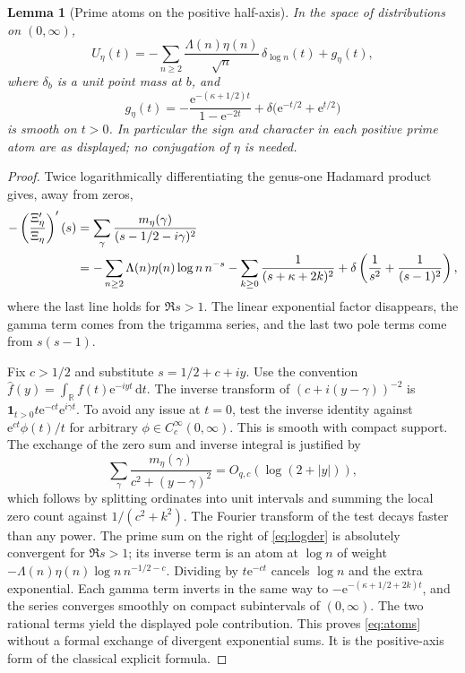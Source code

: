 \documentclass[11pt]{article}
\newtheorem{lemma}[theorem]{Lemma}
\theoremstyle{remark}\newtheorem{remark}[theorem]{Remark}
\newcommand{\R}{\mathbb R}
\newcommand{\dd}{\,\mathrm d}
\newcommand{\e}{\mathrm e}
\newcommand{\ind}{\mathbf 1}
\begin{document}
\begin{lemma}[Prime atoms on the positive half-axis]\label{lem:atoms}
In the space of distributions on $(0,\infty)$,
\begin{equation}\label{eq:atoms}
 U_\eta(t)=-\sum_{n\ge2}\frac{\Lambda(n)\eta(n)}{\sqrt n}\,\delta_{\log n}(t)+g_\eta(t),
\end{equation}
where $\delta_b$ is a unit point mass at $b$, and
\[
 g_\eta(t)=-\frac{\e^{-(\kappa+1/2)t}}{1-\e^{-2t}}
 +\delta\bigl(\e^{-t/2}+\e^{t/2}\bigr)
\]
is smooth on $t>0$. In particular the sign and character in each positive prime atom are as displayed; no conjugation of $\eta$ is needed.
\end{lemma}
\begin{proof}
Twice logarithmically differentiating the genus-one Hadamard product gives, away from zeros,
\begin{align}
 -\left(\frac{\Xi_\eta'}{\Xi_\eta}\right)'(s)
 &=\sum_{\gamma}\frac{m_\eta(\gamma)}{(s-1/2-i\gamma)^2}\notag\\
 &=-\sum_{n\ge2}\Lambda(n)\eta(n)\log n\, n^{-s}
 -\sum_{k\ge0}\frac1{(s+\kappa+2k)^2}
 +\delta\left(\frac1{s^2}+\frac1{(s-1)^2}\right),\label{eq:logder}
\end{align}
where the last line holds for $\Re s>1$. The linear exponential factor disappears, the gamma term comes from the trigamma series, and the last two pole terms come from $s(s-1)$.

Fix $c>1/2$ and substitute $s=1/2+c+iy$. Use the convention $\widehat f(y)=\int_\R f(t)\e^{-iyt}\dd t$. The inverse transform of $(c+i(y-\gamma))^{-2}$ is $\ind_{t>0}t\e^{-ct}\e^{i\gamma t}$. To avoid any issue at $t=0$, test the inverse identity against $\e^{ct}\phi(t)/t$ for arbitrary $\phi\in C_c^\infty(0,\infty)$. This is smooth with compact support. The exchange of the zero sum and inverse integral is justified by
\[
 \sum_\gamma\frac{m_\eta(\gamma)}{c^2+(y-\gamma)^2}=O_{q,c}(\log(2+|y|)),
\]
which follows by splitting ordinates into unit intervals and summing the local zero count against $1/(c^2+k^2)$. The Fourier transform of the test decays faster than any power. The prime sum on the right of \eqref{eq:logder} is absolutely convergent for $\Re s>1$; its inverse term is an atom at $\log n$ of weight $-\Lambda(n)\eta(n)\log n\,n^{-1/2-c}$. Dividing by $t\e^{-ct}$ cancels $\log n$ and the extra exponential. Each gamma term inverts in the same way to $-\e^{-(\kappa+1/2+2k)t}$, and the series converges smoothly on compact subintervals of $(0,\infty)$. The two rational terms yield the displayed pole contribution. This proves \eqref{eq:atoms} without a formal exchange of divergent exponential sums. It is the positive-axis form of the classical explicit formula.
\end{proof}
\end{document}
